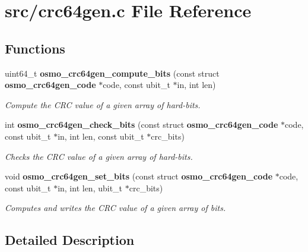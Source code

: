 \section{src/crc64gen.c File Reference}
\label{crc64gen_8c}
\subsection*{Functions}
\begin{DoxyCompactItemize}
\item 
uint64\_\-t {\bf osmo\_\-crc64gen\_\-compute\_\-bits} (const struct {\bf osmo\_\-crc64gen\_\-code} $\ast$code, const ubit\_\-t $\ast$in, int len)
\begin{DoxyCompactList}\small\item\em Compute the CRC value of a given array of hard-\/bits. \item\end{DoxyCompactList}\item 
int {\bf osmo\_\-crc64gen\_\-check\_\-bits} (const struct {\bf osmo\_\-crc64gen\_\-code} $\ast$code, const ubit\_\-t $\ast$in, int len, const ubit\_\-t $\ast$crc\_\-bits)
\begin{DoxyCompactList}\small\item\em Checks the CRC value of a given array of hard-\/bits. \item\end{DoxyCompactList}\item 
void {\bf osmo\_\-crc64gen\_\-set\_\-bits} (const struct {\bf osmo\_\-crc64gen\_\-code} $\ast$code, const ubit\_\-t $\ast$in, int len, ubit\_\-t $\ast$crc\_\-bits)
\begin{DoxyCompactList}\small\item\em Computes and writes the CRC value of a given array of bits. \item\end{DoxyCompactList}\end{DoxyCompactItemize}


\subsection{Detailed Description}
